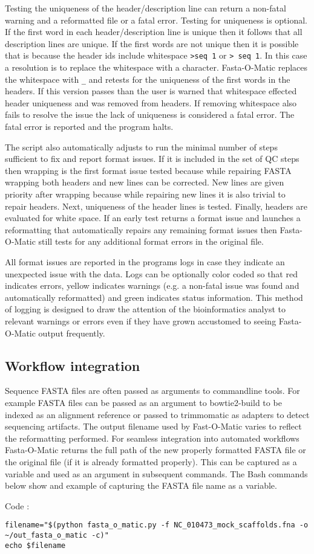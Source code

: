 Testing the uniqueness of the header/description line can return a non-fatal warning and a reformatted file or a fatal error. Testing for uniqueness is optional. If the first word in each header/description line is unique then it follows that all description lines are unique. If the first words are not unique then it is possible that is because the header ids include whitespace \verb|>seq 1| or \verb|> seq 1|. In this case a resolution is to replace the whitespace with a character. Fasta-O-Matic replaces the whitespace with \verb|_| and retests for the uniqueness of the first words in the headers. If this version passes than the user is warned that whitespace effected header uniqueness and was removed from headers. If removing whitespace also fails to resolve the issue the lack of uniqueness is considered a fatal error. The fatal error is reported and the program halts.

The script also automatically adjusts to run the minimal number of steps sufficient to fix and report format issues. If it is included in the set of QC steps then wrapping is the first format issue tested because while repairing FASTA wrapping both headers and new lines can be corrected. New lines are given priority after wrapping because while repairing new lines it is also trivial to repair headers. Next, uniqueness of the header lines is tested. Finally, headers are evaluated for white space. If an early test returns a format issue and launches a reformatting that automatically repairs any remaining format issues then Fasta-O-Matic still tests for any additional format errors in the original file. 

All format issues are reported in the programs logs in case they indicate an unexpected issue with the data. Logs can be optionally color coded so that red indicates errors, yellow indicates warnings (e.g. a non-fatal issue was found and automatically reformatted) and green indicates status information. This method of logging is designed to draw the attention of the bioinformatics analyst to relevant warnings or errors even if they have grown accustomed to seeing Fasta-O-Matic output frequently.
  
\subsection{Workflow integration}
 
Sequence FASTA files are often passed as arguments to commandline tools. For example FASTA files can be passed as an argument to bowtie2-build to be indexed as an alignment reference \cite{langmead2012fast} or passed to trimmomatic as adapters to detect sequencing artifacts. The output filename used by Fast-O-Matic varies to reflect the reformatting performed. For seamless integration into automated workflows Fasta-O-Matic returns the full path of the new properly formatted FASTA file or the original file (if it is already formatted properly). This can be captured as a variable and used as an argument in subsequent commands. The Bash commands below show and example of capturing the FASTA file name as a variable.

Code :

\begin{verbatim}
filename="$(python fasta_o_matic.py -f NC_010473_mock_scaffolds.fna -o ~/out_fasta_o_matic -c)"
echo $filename
\end{verbatim}
  
  
  
  
  
  
  
  
  